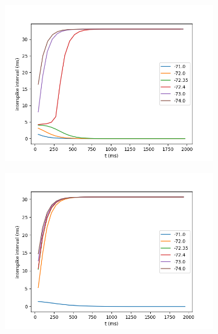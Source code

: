 \documentclass{article}
\begin{document}
\begin{figure}[h]
	\centering
	\begin{subfigure}[t]{0.30\linewidth}
		\centering
		\includegraphics[width = 1.0\linewidth, trim={20 10 20 20}, clip=true]{intervals_ts_10i.png}
		\label{fig:ts10}	
	\end{subfigure}%
	\hspace{0.03\linewidth}
	\begin{subfigure}[t]{0.30\linewidth}
		\centering
		\includegraphics[width = 1.0\linewidth, trim={20 10 20 20}, clip=true]{intervals_ts_7i.png}
		\label{fig:ts7}	
	\end{subfigure}%
	\hspace{0.03\linewidth}

\end{figure}
\end{document}
